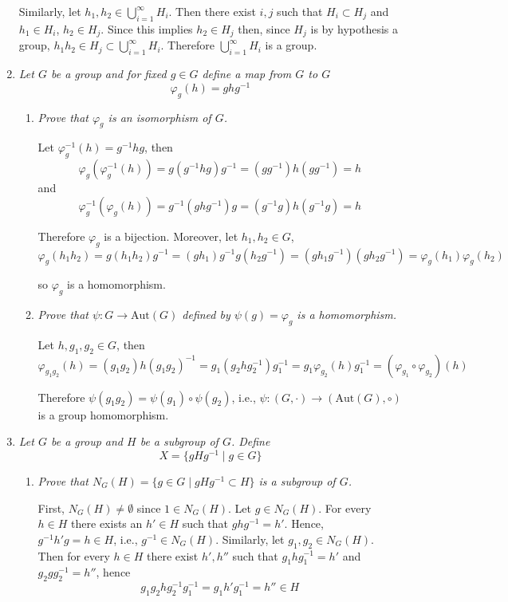 \documentclass[letterpaper, 11pt]{article}
\begin{document}
\begin{enumerate}
Similarly, let $h_1, h_2 \in \bigcup_{i=1}^\infty H_i$.  Then there exist $i,j$ such that $H_i \subset H_j$ and $h_1 \in H_i$, $h_2 \in H_j$.  Since this implies $h_2 \in H_j$ then, since $H_j$ is by hypothesis a group, $h_1h_2 \in H_j \subset \bigcup_{i=1}^\infty H_i$.  Therefore $\bigcup_{i=1}^\infty H_i$ is a group. 

\item \emph{Let $G$ be a group and for fixed $g \in G$ define a map from $G$ to $G$ $$\varphi_g(h) = ghg^{-1}$$}
\begin{enumerate}
\item \emph{Prove that $\varphi_g$ is an isomorphism of $G$.}

Let $\varphi_g^{-1}(h) = g^{-1}hg$, then
\[
\varphi_g(\varphi_g^{-1}(h)) = g(g^{-1}hg)g^{-1} = (gg^{-1})h(gg^{-1}) = h
\]
and
\[
\varphi_g^{-1}(\varphi_g(h)) = g^{-1}(ghg^{-1})g = (g^{-1}g)h(g^{-1}g) = h
\]

Therefore $\varphi_g$ is a bijection.  Moreover, let $h_1, h_2 \in G$,
\[
\varphi_g(h_1h_2) = g(h_1h_2)g^{-1} = (gh_1)g^{-1}g(h_2g^{-1}) = (gh_1g^{-1})(gh_2g^{-1}) = \varphi_g(h_1)\varphi_g(h_2)
\]

so $\varphi_g$ is a homomorphism.
\item \emph{Prove that $\psi: G \rightarrow \text{Aut}(G)$ defined by $\psi(g) = \varphi_g$ is a homomorphism.}

Let $h,g_1, g_2 \in G$, then
\[
\varphi_{g_1g_2}(h) = (g_1g_2)h(g_1g_2)^{-1} = g_1(g_2hg_2^{-1})g_1^{-1} = g_1\varphi_{g_2}(h)g_1^{-1} = (\varphi_{g_1} \circ \varphi_{g_2})(h)
\]

Therefore $\psi(g_1g_2) = \psi(g_1) \circ \psi(g_2)$, i.e., $\psi: (G, \cdot) \rightarrow (\text{Aut}(G), \circ)$ is a group homomorphism.

\end{enumerate}

\item \emph{Let $G$ be a group and $H$ be a subgroup of $G$.  Define $$ X = \{gHg^{-1} \mid g \in G\}$$}
\begin{enumerate}
\item \emph{Prove that $N_G(H) = \{g \in G \mid gHg^{-1} \subset H\}$ is a subgroup of $G$.}

First, $N_G(H) \neq \emptyset$ since $1 \in N_G(H)$.  Let $g \in N_G(H)$.  For every $h \in H$ there exists an $h' \in H$ such that $ghg^{-1} = h'$.  Hence, $g^{-1}h'g = h \in H$, i.e., $g^{-1} \in N_G(H)$.  Similarly, let $g_1, g_2 \in N_G(H)$. Then for every $h \in H$ there exist $h', h''$ such that $g_1hg_1^{-1} = h'$ and $g_2gg_2^{-1} = h''$, hence
\[
g_1g_2hg_2^{-1}g_1^{-1} = g_1h'g_1^{-1} = h'' \in H
\]


\end{enumerate}
\end{enumerate}
\end{document}
